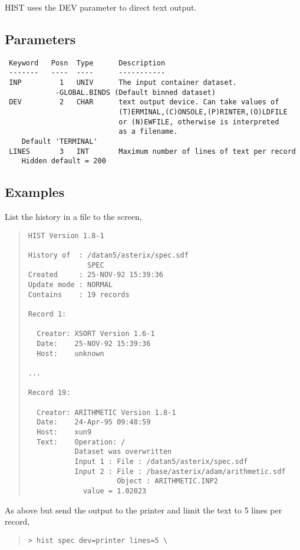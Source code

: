 \documentclass{book}
\renewcommand{\_}{{\tt\char'137}}     %
\begin{document}
HIST uses the DEV parameter to direct text output.

\subsection{Parameters}
\begin{verbatim}
 Keyword   Posn  Type      Description
 -------   ----  ----      -----------
 INP         1   UNIV      The input container dataset.
            -GLOBAL.BINDS (Default binned dataset)
 DEV         2   CHAR      text output device. Can take values of
                           (T)ERMINAL,(C)ONSOLE,(P)RINTER,(O)LDFILE
                           or (N)EWFILE, otherwise is interpreted
                           as a filename.
    Default 'TERMINAL'
 LINES       3   INT       Maximum number of lines of text per record
    Hidden default = 200

\end{verbatim}\subsection{Examples}
List the history in a file to the screen,
\begin{quote}\begin{verbatim}
HIST Version 1.8-1

History of  : /datan5/asterix/spec.sdf
              SPEC
Created     : 25-NOV-92 15:39:36
Update mode : NORMAL
Contains    : 19 records

Record 1:

  Creator: XSORT Version 1.6-1
  Date:    25-NOV-92 15:39:36
  Host:    unknown

...

Record 19:

  Creator: ARITHMETIC Version 1.8-1
  Date:    24-Apr-95 09:48:59
  Host:    xun9
  Text:    Operation: /
           Dataset was overwritten
           Input 1 : File : /datan5/asterix/spec.sdf
           Input 2 : File : /base/asterix/adam/arithmetic.sdf
                     Object : ARITHMETIC.INP2
             value = 1.02023

\end{verbatim}\end{quote}
As above but send the output to the printer and limit the text to 5 lines
per record,
\begin{quote}\begin{verbatim}
> hist spec dev=printer lines=5 \
\end{verbatim}\end{quote}
\end{document}
